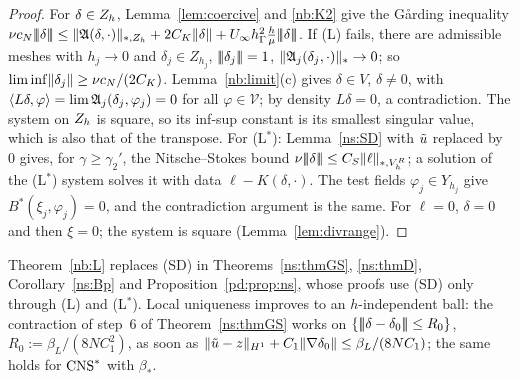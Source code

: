 \begin{proof}
For $\delta\in Z_h$, Lemma~\ref{lem:coercive} and \eqref{nb:K2} give the G\aa rding inequality $\nu c_N\tnorm\delta\le\norm{\Aop(\delta,\cdot)}_{\ast,\Zh}+2C_K\norm\delta+U_\infty\hG^2\frac h\mu\tnorm\delta$. If (L) fails, there are admissible meshes with $h_j\to0$ and $\delta_j\in Z_{h_j}$, $|\!|\!|\delta_j|\!|\!|=1$, $\lVert \mathfrak A_j(\delta_j,\cdot)\rVert_\ast\to0$; so $\liminf\lVert \delta_j\rVert\ge\nu c_N/(2C_K)$. Lemma~\ref{nb:limit}(c) gives $\delta\in V$, $\delta\ne0$, with $\langle L\delta,\varphi\rangle=\lim\mathfrak A_j(\delta_j,\varphi_j)=0$ for all $\varphi\in\mathcal V$; by density $L\delta=0$, a contradiction. The system on $Z_h$ is square, so its inf-sup constant is its smallest singular value, which is also that of the transpose. For (L$^\ast$): Lemma~\ref{ns:SD} with $\tilde u$ replaced by $0$ gives, for $\gamma\ge\gamma_2'$, the Nitsche--Stokes bound $\nu|\!|\!|\delta|\!|\!|\le C_S\lVert \ell\rVert_{\ast,V_h^R}$; a solution of the (L$^\ast$) system solves it with data $\ell-K(\delta,\cdot)$. The test fields $\varphi_j\in Y_{h_j}$ give $B^\ast(\xi_j,\varphi_j)=0$, and the contradiction argument is the same. For $\ell=0$, $\delta=0$ and then $\xi=0$; the system is square (Lemma~\ref{lem:divrange}).
\end{proof}

Theorem~\ref{nb:L} replaces (SD) in Theorems~\ref{ns:thmGS}, \ref{ns:thmD}, Corollary~\ref{ns:Bp} and Proposition~\ref{pd:prop:ns}, whose proofs use (SD) only through (L) and (L$^\ast$). Local uniqueness improves to an $h$-independent ball: the contraction of step~6 of Theorem~\ref{ns:thmGS} works on $\{|\!|\!|\delta-\delta_0|\!|\!|\le R_0\}$, $R_0:=\beta_L/(8NC_1^2)$, as soon as $\lVert \tilde u-z\rVert_{H^1}+C_1\lVert \nabla\delta_0\rVert\le\beta_L/(8NC_1)$; the same holds for $\mathrm{CNS}^\ast$ with $\beta_\ast$.

